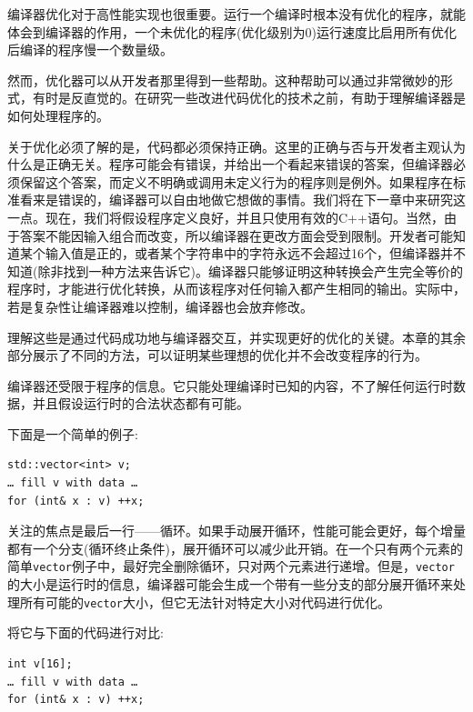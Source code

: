 
编译器优化对于高性能实现也很重要。运行一个编译时根本没有优化的程序，就能体会到编译器的作用，一个未优化的程序(优化级别为0)运行速度比启用所有优化后编译的程序慢一个数量级。

然而，优化器可以从开发者那里得到一些帮助。这种帮助可以通过非常微妙的形式，有时是反直觉的。在研究一些改进代码优化的技术之前，有助于理解编译器是如何处理程序的。


关于优化必须了解的是，代码都必须保持正确。这里的正确与否与开发者主观认为什么是正确无关。程序可能会有错误，并给出一个看起来错误的答案，但编译器必须保留这个答案，而定义不明确或调用未定义行为的程序则是例外。如果程序在标准看来是错误的，编译器可以自由地做它想做的事情。我们将在下一章中来研究这一点。现在，我们将假设程序定义良好，并且只使用有效的C++语句。当然，由于答案不能因输入组合而改变，所以编译器在更改方面会受到限制。开发者可能知道某个输入值是正的，或者某个字符串中的字符永远不会超过16个，但编译器并不知道(除非找到一种方法来告诉它)。编译器只能够证明这种转换会产生完全等价的程序时，才能进行优化转换，从而该程序对任何输入都产生相同的输出。实际中，若是复杂性让编译器难以控制，编译器也会放弃修改。

理解这些是通过代码成功地与编译器交互，并实现更好的优化的关键。本章的其余部分展示了不同的方法，可以证明某些理想的优化并不会改变程序的行为。

编译器还受限于程序的信息。它只能处理编译时已知的内容，不了解任何运行时数据，并且假设运行时的合法状态都有可能。

下面是一个简单的例子:

\begin{lstlisting}[style=styleCXX]
std::vector<int> v;
… fill v with data … 
for (int& x : v) ++x;
\end{lstlisting}

关注的焦点是最后一行——循环。如果手动展开循环，性能可能会更好，每个增量都有一个分支(循环终止条件)，展开循环可以减少此开销。在一个只有两个元素的简单\texttt{vector}例子中，最好完全删除循环，只对两个元素进行递增。但是，\texttt{vector}的大小是运行时的信息，编译器可能会生成一个带有一些分支的部分展开循环来处理所有可能的\texttt{vector}大小，但它无法针对特定大小对代码进行优化。

将它与下面的代码进行对比:

\begin{lstlisting}[style=styleCXX]
int v[16];
… fill v with data … 
for (int& x : v) ++x;
\end{lstlisting}

